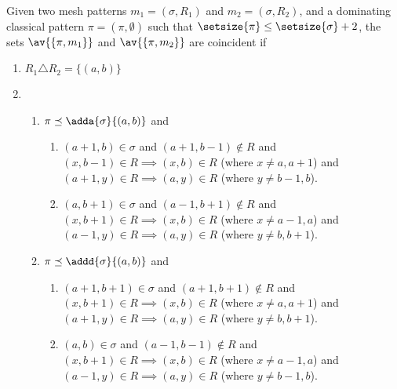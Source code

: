 \begin{proposition}
    \label{prop:dom2}
    Given two mesh patterns \(m_1 =(\sigma, R_1)\) and \(m_2 = (\sigma, R_2)\),
    and a dominating classical pattern \(\pi = (\pi,\emptyset)\) such that
    \(\setsize{\pi} \le \setsize{\sigma} + 2\), the sets \(\av{\{\pi,m_1\}}\) and
    \(\av{\{\pi,m_2\}}\) are coincident if

    \begin{enumerate}
        \item \(R_1 \triangle R_2 = \{(a,b)\}\)
        \item   \begin{enumerate}
                \item\label{prop:dom2:condc} \(\pi \preceq \adda{\sigma}{(a,b)}\) and
                        \begin{enumerate}
                            \item \((a+1,b) \in \sigma\) and \((a+1,b-1)\notin R\) and \\
                                \((x,b-1)\in R \implies (x,b) \in R \) (where \(x\neq a,a+1\)) and\\
                                  \((a+1,y)\in R \implies (a,y) \in R\) (where \(y\neq b-1,b\)).
                            \item \((a,b+1) \in \sigma\) and \((a-1,b+1)\notin R\) and \\
                                  \((x,b+1)\in R \implies (x,b) \in R\) (where \(x\neq a-1,a\)) and\\
                                  \((a-1,y)\in R \implies (a,y) \in R\) (where \(y\neq b,b+1\)).
                        \end{enumerate}
                    \item \(\pi \preceq \addd{\sigma}{(a,b)}\) and
                        \begin{enumerate}
                            \item \((a+1,b+1) \in \sigma\) and \((a+1,b+1)\notin R\) and \\
                                  \((x,b+1)\in R \implies (x,b) \in R\) (where \(x\neq a,a+1\)) and\\
                                  \((a+1,y)\in R \implies (a,y) \in R\) (where \(y\neq b,b+1\)).
                            \item \((a,b) \in \sigma\) and \((a-1,b-1)\notin R\) and \\
                                  \((x,b+1)\in R \implies (x,b) \in R\) (where \(x\neq a-1,a\)) and\\
                                  \((a-1,y)\in R \implies (a,y) \in R\)  (where \(y\neq b-1,b\)).
                        \end{enumerate}
                \end{enumerate}
    \end{enumerate}
\end{proposition}
